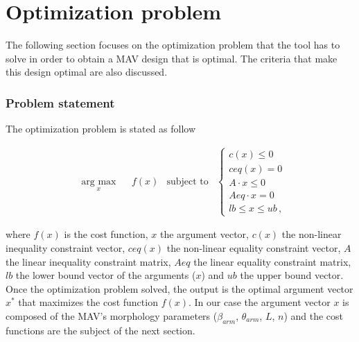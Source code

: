 \section{Optimization problem}
\label{sec:optimization_problem}
The following section focuses on the optimization problem that the tool has to
solve in order to obtain a MAV design that is optimal. The criteria that make
this design optimal are also discussed.

\subsubsection{Problem statement}
\label{sec:problem}
 The optimization problem is stated as follow

\begin{equation}
  \label{opt_pb}
  \begin{aligned}
    & \underset{x}{\text{arg max}}
    & & f(x) &\text{subject to} &
    \begin{cases}
      c(x) \leq 0 \\
      ceq(x) = 0 \\
      A\cdot x \leq 0 \\
      Aeq \cdot x = 0 \\
      lb \leq x \leq ub\, ,
    \end{cases}
  \end{aligned}
\end{equation}

where $f(x)$ is the cost function, $x$ the argument vector, $c(x)$
the non-linear inequality constraint vector, $ceq(x)$ the non-linear equality
constraint vector, $A$ the linear inequality constraint matrix, $Aeq$ the linear
equality constraint matrix, $lb$ the lower bound vector of the arguments ($x$)
and $ub$ the upper bound vector.\\
Once the optimization problem solved, the output is the optimal argument vector
$x^*$ that maximizes the cost function $f(x)$. In our case the argument vector
$x$ is composed of the MAV's morphology parameters ($\beta_{arm}$, $\theta_{arm}$, $L$, $n$)
and the cost functions are the subject of the next section.

